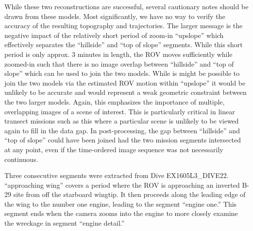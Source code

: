 \documentclass[letterpaper,12pt]{article}
\begin{document}
While these two reconstructions are successful, several cautionary notes should be drawn from these models.   Most significantly, we have no way to verify the accuracy of the resulting topography and trajectories.    The larger message is the negative impact of the relatively short period of zoom-in ``upslope'' which effectively separates the ``hillside'' and ``top of slope'' segments.  While this short period is only approx. 3 minutes in length, the ROV moves sufficiently while zoomed-in such that there is no image overlap between ``hillside'' and ``top of slope'' which can be used to join the two models.  While is might be possible to join the two models via the estimated ROV motion within ``upslope'' it would be unlikely to be accurate and would represent a weak geometric constraint between the two larger models.   Again, this emphasizes the importance of multiple, overlapping images of a scene of interest.  This is particularly critical in linear transect missions such as this where a particular scene is unlikely to be viewed again to fill in the data gap.    In post-processing, the gap between ``hillside'' and ``top of slope'' could have been joined had the two mission segments intersected at any point, even if the time-ordered image sequence was not necessarily continuous.

Three consecutive segments were extracted from Dive EX1605L3\_DIVE22. ``approaching wing'' covers a period where the ROV is approaching an inverted B-29 site from off the starboard wingtip.  It then proceeds along the leading edge of the wing to the number one engine, leading to the segment ``engine one.''  This segment ends when the camera zooms into the engine to more closely examine the wreckage in segment ``engine detail.''
\end{document}
